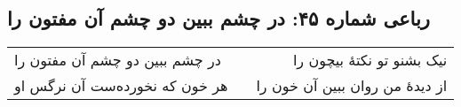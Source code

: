 \begin{center}
\section*{رباعی شماره ۴۵: در چشم ببین دو چشم آن مفتون را}
\label{sec:0045}
\begin{longtable}{l p{0.5cm} r}
در چشم ببین دو چشم آن مفتون را
&&
نیک بشنو تو نکتهٔ بیچون را
\\
هر خون که نخورده‌ست آن نرگس او
&&
از دیدهٔ من روان ببین آن خون را
\\
\end{longtable}
\end{center}

